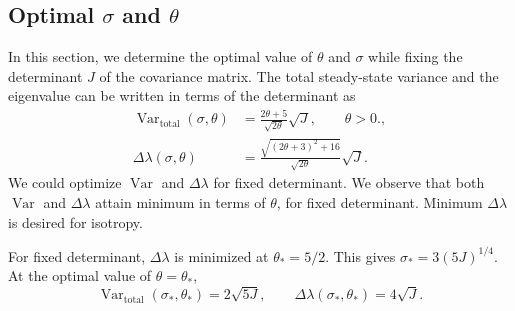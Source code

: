 \documentclass[11pt]{article}
\begin{document}

\subsection{Optimal $\sigma$ and $\theta$}

In this section, we determine the optimal value of $\theta$ and $\sigma$ while fixing the determinant $J$ of the covariance matrix. The total steady-state variance and the eigenvalue can be written in terms of the determinant as
\begin{align}
    \operatorname{Var}_{\mathrm{total}}(\sigma,\theta)
     & =\frac{2\theta+5}{\sqrt{2\theta}}\sqrt{J},
    \qquad \theta>0.,                                           \\
    \Delta\lambda(\sigma,\theta)
     & =\frac{\sqrt{(2\theta+3)^2+16}}{\sqrt{2\theta}}\sqrt{J}.
\end{align}
We could optimize $\operatorname{Var}$ and $\Delta \lambda$ for fixed determinant. We observe that both $\operatorname{Var}$ and $\Delta \lambda$ attain minimum in terms of $\theta$, for fixed determinant. Minimum $\Delta \lambda$ is desired for isotropy.

For fixed determinant, $\Delta \lambda$ is minimized at $\theta_* = 5/2 $. This gives $\sigma_* = 3(5J)^{1/4}$. At the optimal value of $\theta = \theta_*$,
\begin{equation}
    \operatorname{Var}_{\mathrm{total}}(\sigma_*,\theta_*)
    =2\sqrt{5J},
    \qquad
    \Delta\lambda(\sigma_*,\theta_*)
    =4\sqrt{J}.
\end{equation}
\end{document}
